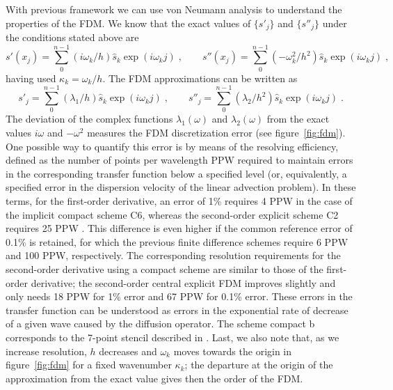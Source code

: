 With previous framework we can use von Neumann analysis to understand the properties of the FDM. We know that the exact values of $\{s'_j\}$ and $\{s''_j\}$ under the conditions stated above are
\begin{equation}
  s'(x_j) =\sum_0^{n-1} (i\omega_k/h)  \hat{s}_k\exp(i\omega_kj)\;,\qquad
  s''(x_j)=\sum_0^{n-1} (-\omega^2_k/h^2)\hat{s}_k\exp(i\omega_kj)\;,
\end{equation}
having used $\kappa_k=\omega_k/h$. The FDM approximations can be written as
\begin{equation}
  s'_j =\sum_0^{n-1} (\lambda_1/h)  \hat{s}_k\exp(i\omega_kj)\;,\qquad
  s''_j=\sum_0^{n-1} (\lambda_2/h^2)\hat{s}_k\exp(i\omega_kj)\;.
  \label{equ:lambda}
\end{equation}
The deviation of the complex functions $\lambda_1(\omega)$ and $\lambda_2(\omega)$ from the exact values $i\omega$ and $-\omega^2$ measures the FDM discretization error (see figure~\ref{fig:fdm}).  One possible way to quantify this error is by means of the resolving efficiency, defined as the number of points per wavelength PPW required to maintain errors in the corresponding transfer function below a specified level (or, equivalently, a specified error in the dispersion velocity of the linear advection problem). In these terms, for the first-order derivative, an error of 1\% requires 4 PPW in the case of the implicit compact scheme C6, whereas the second-order explicit scheme C2 requires 25 PPW \citep{Lele:1992,Lomax:1998}. This difference is even higher if the common reference error of 0.1\% is retained, for which the previous finite difference schemes require 6 PPW and 100 PPW, respectively. The corresponding resolution requirements for the second-order derivative using a compact scheme are similar to those of the first-order derivative; the second-order central explicit FDM improves slightly and only needs 18 PPW for 1\% error and 67 PPW for 0.1\% error. These errors in the transfer function can be understood as errors in the exponential rate of decrease of a given wave caused by the diffusion operator. The scheme compact b corresponds to the 7-point stencil described in \cite{Lamballais:2011}.
Last, we also note that, as we increase resolution, $h$ decreases and $\omega_k$ moves towards the origin in figure~\ref{fig:fdm} for a fixed wavenumber $\kappa_k$; the departure at the origin of the approximation from the exact value gives then the order of the FDM.

